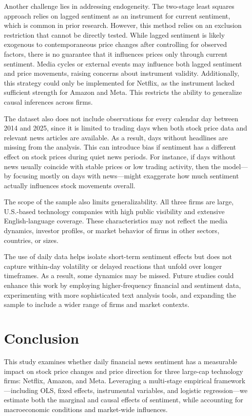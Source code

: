 \documentclass[12pt]{article}
\begin{document}
Another challenge lies in addressing endogeneity. The two-stage least squares approach relies on lagged sentiment as an instrument for current sentiment, which is common in prior research. However, this method relies on an exclusion restriction that cannot be directly tested. While lagged sentiment is likely exogenous to contemporaneous price changes after controlling for observed factors, there is no guarantee that it influences prices only through current sentiment. Media cycles or external events may influence both lagged sentiment and price movements, raising concerns about instrument validity. Additionally, this strategy could only be implemented for Netflix, as the instrument lacked sufficient strength for Amazon and Meta. This restricts the ability to generalize causal inferences across firms.

The dataset also does not include observations for every calendar day between 2014 and 2025, since it is limited to trading days when both stock price data and relevant news articles are available. As a result, days without headlines are missing from the analysis. This can introduce bias if sentiment has a different effect on stock prices during quiet news periods. For instance, if days without news usually coincide with stable prices or low trading activity, then the model—by focusing mostly on days with news—might exaggerate how much sentiment actually influences stock movements overall.

The scope of the sample also limits generalizability. All three firms are large, U.S.-based technology companies with high public visibility and extensive English-language coverage. These characteristics may not reflect the media dynamics, investor profiles, or market behavior of firms in other sectors, countries, or sizes.

The use of daily data helps isolate short-term sentiment effects but does not capture within-day volatility or delayed reactions that unfold over longer timeframes. As a result, some dynamics may be missed. Future studies could enhance this work by employing higher-frequency financial and sentiment data, experimenting with more sophisticated text analysis tools, and expanding the sample to include a wider range of firms and market contexts.

\section{Conclusion}
\label{sec:conclusion}

This study examines whether daily financial news sentiment has a measurable impact on stock price changes and price direction for three large-cap technology firms: Netflix, Amazon, and Meta. Leveraging a multi-stage empirical framework—including OLS, fixed effects, instrumental variables, and logistic regression—we estimate both the marginal and causal effects of sentiment, while accounting for macroeconomic conditions and market-wide influences.
\end{document}
